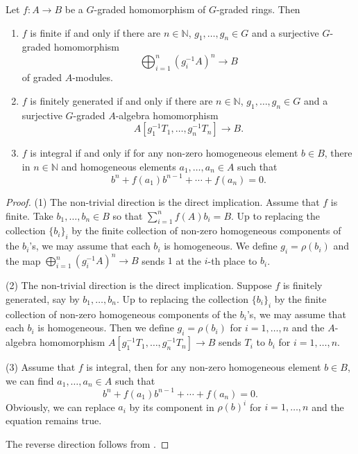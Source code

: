 \begin{proposition}
    Let $f:A\rightarrow B$ be a $G$-graded homomorphism of $G$-graded rings. Then 
    \begin{enumerate}
        \item $f$ is finite if and only if there are $n\in \mathbb{N}$, $g_1,\ldots,g_n\in G$ and a surjective $G$-graded homomorphism 
        \[
            \bigoplus_{i=1}^n(g_i^{-1}A)^n\rightarrow B
        \] 
        of graded $A$-modules.
        \item $f$ is finitely generated if and only if there are $n\in \mathbb{N}$,  $g_1,\ldots,g_n\in G$ and a surjective $G$-graded $A$-algebra homomorphism
        \[
            A[g_1^{-1}T_1,\ldots,g_{n}^{-1}T_n]\rightarrow B.  
        \] 
        \item $f$ is integral if and only if for any non-zero homogeneous element $b\in B$, there in $n\in \mathbb{N}$ and homogeneous elements $a_1,\ldots,a_n\in A$ such that
        \[
            b^n+f(a_1)b^{n-1}+\cdots+f(a_n)=0.  
        \]
    \end{enumerate}
\end{proposition}
\begin{proof}
    (1) The non-trivial direction is the direct implication. Assume that $f$ is finite. Take $b_1,\ldots,b_n\in B$ so that $\sum_{i=1}^nf(A)b_i=B$. Up to replacing the collection $\{b_i\}_i$ by the finite collection of non-zero homogeneous components of the $b_i$'s, we may assume that each $b_i$ is homogeneous. We define $g_i=\rho(b_i)$ and the map $\bigoplus_{i=1}^n(g_i^{-1}A)^n\rightarrow B$ sends $1$ at the $i$-th place to $b_i$. 

    (2) The non-trivial direction is the direct implication. Suppose $f$ is finitely generated, say by $b_1,\ldots,b_n$. Up to replacing the collection $\{b_i\}_i$ by the finite collection of non-zero homogeneous components of the $b_i$'s, we may assume that each $b_i$ is homogeneous. Then we define $g_i=\rho(b_i)$ for $i=1,\ldots,n$ and the $A$-algebra homomorphism $A[g_1^{-1}T_1,\ldots,g_{n}^{-1}T_n]\rightarrow B$ sends $T_i$ to $b_i$ for $i=1,\ldots,n$.

    (3) Assume that $f$ is integral, then for any non-zero homogeneous element $b\in B$, we can find $a_1,\ldots,a_n\in A$ such that 
    \[
        b^n+f(a_1)b^{n-1}+\cdots+f(a_n)=0.  
    \]
    Obviously, we can replace $a_i$ by its component in $\rho(b)^i$ for $i=1,\ldots,n$ and the equation remains true.

    The reverse direction follows from \cite[\href{https://stacks.math.columbia.edu/tag/00GO}{Tag 00GO}]{stacks-project}.
\end{proof}

